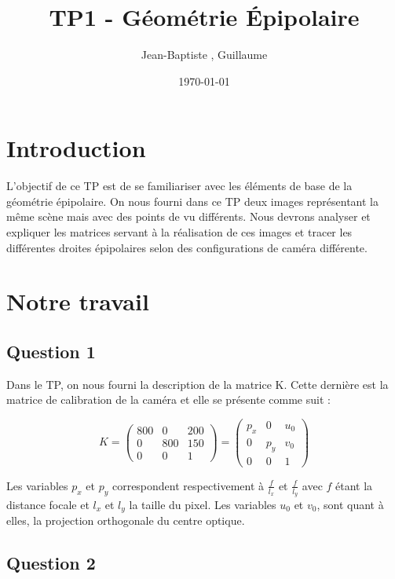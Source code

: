 \documentclass[12pt]{report}
\title{TP1 - Géométrie \'Epipolaire}
\author{Jean-Baptiste \bsc{Morice}, Guillaume \bsc{Versal}}
\date{\today}
\begin{document}
\maketitle

\tableofcontents

\newpage
\section*{Introduction}

L'objectif de ce TP est de se familiariser avec les éléments de base de la géométrie épipolaire. On nous fourni dans ce TP deux images représentant la même scène mais avec des points de vu différents. Nous devrons analyser et expliquer les matrices servant à la réalisation de ces images et tracer les différentes droites épipolaires selon des configurations de caméra différente.

\newpage
\section{Notre travail}

\subsection*{Question 1}

Dans le TP, on nous fourni la description de la matrice K. Cette dernière est la matrice de calibration de la caméra et elle se présente comme suit :

\[ K = \begin{pmatrix}
800 & 0 & 200 \\ 
0 & 800 & 150 \\ 
0 & 0 & 1
\end{pmatrix} = 
\begin{pmatrix}
p_x & 0 & u_0 \\ 
0 & p_y & v_0 \\ 
0 & 0 & 1
\end{pmatrix}\]

Les variables $p_x$ et $p_y$ correspondent respectivement à $\frac{f}{l_x}$ et $\frac{f}{l_y}$ avec $f$ étant la distance focale et $l_x$ et $l_y$ la taille du pixel. Les variables $u_0$ et $v_0$, sont quant à elles, la projection orthogonale du centre optique. 

\subsection*{Question 2}
\end{document}
